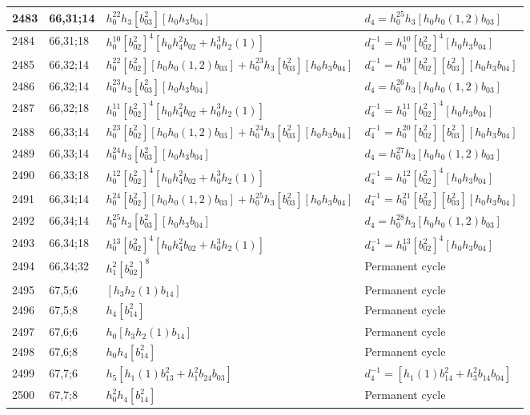 \documentclass{article}
\begin{document}
\begin{longtable}{|l|l|>{\raggedright\arraybackslash}p{6cm}|>{\raggedright\arraybackslash}p{6cm}|}
2483 & 66,31;14 & $h_0^{22}h_3[b_{03}^2][h_0h_3b_{04}]$ &$d_{4}=h_0^{25}h_3[h_0h_0(1, 2)b_{03}]$\\
\hline
2484 & 66,31;18 & $h_0^{10}[b_{02}^2]^4[h_0h_4^2b_{02} + h_0^3h_2(1)]$ & $d_{4}^{-1}=h_0^{10}[b_{02}^2]^4[h_0h_3b_{04}]$\\
\hline
2485 & 66,32;14 & $h_0^{22}[b_{02}^2][h_0h_0(1, 2)b_{03}] + h_0^{23}h_3[b_{03}^2][h_0h_3b_{04}]$ & $d_{4}^{-1}=h_0^{19}[b_{02}^2][b_{03}^2][h_0h_3b_{04}]$\\
2486 & 66,32;14 & $h_0^{23}h_3[b_{03}^2][h_0h_3b_{04}]$ &$d_{4}=h_0^{26}h_3[h_0h_0(1, 2)b_{03}]$\\
\hline
2487 & 66,32;18 & $h_0^{11}[b_{02}^2]^4[h_0h_4^2b_{02} + h_0^3h_2(1)]$ & $d_{4}^{-1}=h_0^{11}[b_{02}^2]^4[h_0h_3b_{04}]$\\
\hline
2488 & 66,33;14 & $h_0^{23}[b_{02}^2][h_0h_0(1, 2)b_{03}] + h_0^{24}h_3[b_{03}^2][h_0h_3b_{04}]$ & $d_{4}^{-1}=h_0^{20}[b_{02}^2][b_{03}^2][h_0h_3b_{04}]$\\
2489 & 66,33;14 & $h_0^{24}h_3[b_{03}^2][h_0h_3b_{04}]$ &$d_{4}=h_0^{27}h_3[h_0h_0(1, 2)b_{03}]$\\
\hline
2490 & 66,33;18 & $h_0^{12}[b_{02}^2]^4[h_0h_4^2b_{02} + h_0^3h_2(1)]$ & $d_{4}^{-1}=h_0^{12}[b_{02}^2]^4[h_0h_3b_{04}]$\\
\hline
2491 & 66,34;14 & $h_0^{24}[b_{02}^2][h_0h_0(1, 2)b_{03}] + h_0^{25}h_3[b_{03}^2][h_0h_3b_{04}]$ & $d_{4}^{-1}=h_0^{21}[b_{02}^2][b_{03}^2][h_0h_3b_{04}]$\\
2492 & 66,34;14 & $h_0^{25}h_3[b_{03}^2][h_0h_3b_{04}]$ &$d_{4}=h_0^{28}h_3[h_0h_0(1, 2)b_{03}]$\\
\hline
2493 & 66,34;18 & $h_0^{13}[b_{02}^2]^4[h_0h_4^2b_{02} + h_0^3h_2(1)]$ & $d_{4}^{-1}=h_0^{13}[b_{02}^2]^4[h_0h_3b_{04}]$\\
\hline
2494 & 66,34;32 & $h_1^2[b_{02}^2]^8$ & Permanent cycle\\
\hline
2495 & 67,5;6 & $[h_3h_2(1)b_{14}]$ & Permanent cycle\\
\hline
2496 & 67,5;8 & $h_4[b_{14}^2]$ & Permanent cycle\\
\hline
2497 & 67,6;6 & $h_0[h_3h_2(1)b_{14}]$ & Permanent cycle\\
\hline
2498 & 67,6;8 & $h_0h_4[b_{14}^2]$ & Permanent cycle\\
\hline
2499 & 67,7;6 & $h_5[h_1(1)b_{13}^2 + h_1^2b_{24}b_{03}]$ & $d_{4}^{-1}=[h_1(1)b_{14}^2 + h_3^2b_{14}b_{04}]$\\
\hline
2500 & 67,7;8 & $h_0^2h_4[b_{14}^2]$ & Permanent cycle\\

\end{longtable}
\end{document}
